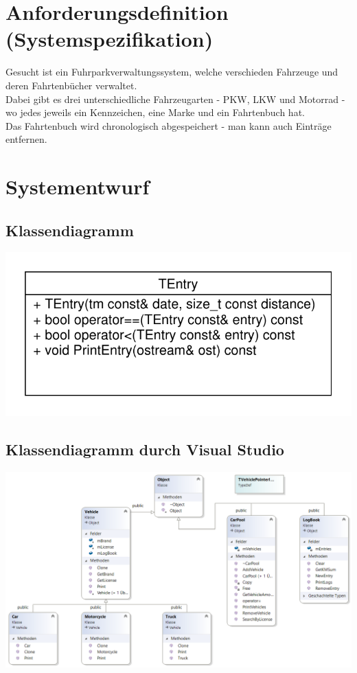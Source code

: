 \newpage
\section{Anforderungsdefinition (Systemspezifikation)}

Gesucht ist ein Fuhrparkverwaltungssystem, welche verschieden Fahrzeuge und deren Fahrtenbücher verwaltet.\\
Dabei gibt es drei unterschiedliche Fahrzeugarten - PKW, LKW und Motorrad - wo jedes jeweils ein Kennzeichen, eine Marke und ein Fahrtenbuch hat.\\
Das Fahrtenbuch wird chronologisch abgespeichert - man kann auch Einträge entfernen. 


\section{Systementwurf}

\subsection{Klassendiagramm}
 \includegraphics[scale = 0.55]{UML-Diagram.pdf}

\subsection{Klassendiagramm durch Visual Studio}
\includegraphics[scale=0.65]{./CarPool/ClassDiagram.png}

